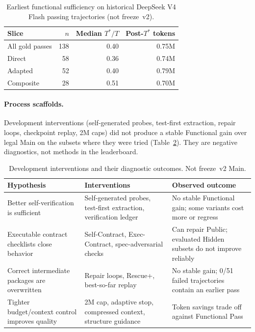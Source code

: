 \begin{table}[t]
  \caption{Earliest functional sufficiency on historical DeepSeek V4 Flash
  passing trajectories (not freeze~v2).}
  \label{tab:tstar}
  \centering
  \begin{tabular}{lrrr}
    \toprule
    \textbf{Slice} & \textbf{$n$} & \textbf{Median $T^*/T$}
      & \textbf{Post-$T^*$ tokens} \\
    \midrule
    All gold passes & 138 & 0.40 & 0.75M \\
    Direct & 58 & 0.36 & 0.74M \\
    Adapted & 52 & 0.40 & 0.79M \\
    Composite & 28 & 0.51 & 0.70M \\
    \bottomrule
  \end{tabular}
\end{table}

\paragraph{Process scaffolds.}
Development interventions (self-generated probes, test-first extraction,
repair loops, checkpoint replay, 2M caps) did not produce a stable Functional
gain over legal Main on the subsets where they were tried
(Table~\ref{tab:negative}). They are negative diagnostics, not methods in
the leaderboard.

\begin{table}[t]
  \caption{Development interventions and their diagnostic outcomes.
  Not freeze~v2 Main.}
  \label{tab:negative}
  \centering
  \begin{tabularx}{\textwidth}{@{}p{}p{}X@{}}
    \toprule
    \textbf{Hypothesis} & \textbf{Interventions} & \textbf{Observed outcome} \\
    \midrule
    Better self-verification is sufficient
      & Self-generated probes, test-first extraction, verification ledger
      & No stable Functional gain; some variants cost more or regress \\
    Executable contract checklists close behavior
      & Self-Contract, Exec-Contract, spec-adversarial checks
      & Can repair Public; evaluated Hidden subsets do not improve reliably \\
    Correct intermediate packages are overwritten
      & Repair loops, Rescue+, best-so-far replay
      & No stable gain; 0/51 failed trajectories contain an earlier pass \\
    Tighter budget/context control improves quality
      & 2M cap, adaptive stop, compressed context, structure guidance
      & Token savings trade off against Functional Pass \\
    \bottomrule
  \end{tabularx}
\end{table}
